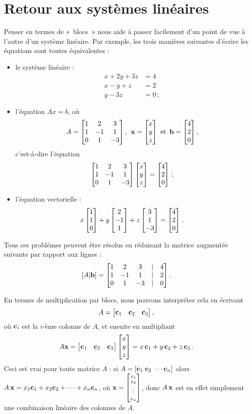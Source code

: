 \section{Retour aux systèmes linéaires}
Penser en termes de «~blocs~» nous aide à passer facilement d'un point de vue à l'autre d'un système linéaire. 
Par exemple, les trois manières suivantes d'écrire les équations sont toutes équivalentes :
\begin{itemize}
\item le système linéaire :
\begin{align*}
x+2y+3z &= 4\\
x-y+z &=2\\
 y-3z&=0\,;
\end{align*}
\item l'\'equation $Ax = b$, o\`u 
$$
A = \mat{1 & 2 & 3\\ 1 & -1 & 1\\ 0 & 1 & -3}, \hspace{0.15cm}\xx = \mat{x\\y\\z}\ \text{et }\, \bb=\mat{4\\2\\0},
$$
c'est-\`a-dire l'équation
$$
\left[ \begin{matrix} 1 & 2 & 3\\ 1 & -1 & 1\\ 0 & 1 & -3 \end{matrix} \right]\left[ \begin{matrix} x\\y\\z \end{matrix} \right]=\left[ \begin{matrix} 4\\2\\0 \end{matrix} \right]\,;
$$
\item l'\'equation vectorielle :
$$
x\left[ \begin{matrix} 1\\1\\0 \end{matrix} \right] + y\left[ \begin{matrix} 2\\-1\\1 \end{matrix} \right] + z\left[ \begin{matrix} 3\\1\\-3 \end{matrix} \right]  =\left[ \begin{matrix} 4\\2\\0 \end{matrix} \right]\,.
$$
\end{itemize}
Tous ces problèmes peuvent être résolus en réduisant la matrice augmentée suivante par rapport aux lignes :
$$
[A|\mathbf{b}] =  \left[ \begin{matrix} 1 & 2 & 3&|& 4\\ 1 & -1 & 1&|&2\\ 0 & 1 & -3&|&0 \end{matrix} \right].\\
$$

En termes de multiplication par blocs, nous pouvons interpr\'eter cela en 
écrivant
$$
A = \left[ \begin{matrix} \mathbf{c}_1 & \mathbf{c}_2 & \mathbf{c}_3 \end{matrix} \right],
$$
où $\mathbf{c}_i$ est la $i$-ème colonne de $A$, et ensuite en multipliant
$$
A\mathbf{x}= \left[ \begin{matrix} \mathbf{c}_1 & \mathbf{c}_2 & \mathbf{c}_3 \end{matrix} \right]\left[ \begin{matrix} x\\y\\z \end{matrix} \right] = x\,\mathbf{c}_1 + y\,\mathbf{c}_2 + z\,\mathbf{c}_3\,.
$$
Ceci est vrai pour toute matrice $A$ : si $A = [\mathbf{c}_1 \;\mathbf{c}_2 \; \cdots \mathbf{c}_n]$
alors $A\,\mathbf{x} = x_1\mathbf{c}_1 + x_2\mathbf{c}_2 + \cdots + x_n\mathbf{c}_n$, o\`u $\mathbf{x}=\scriptsize\left[ \begin{matrix} x_1\\x_2\\ \vdots \\ x_n \end{matrix} \right]$, donc $A\,\mathbf{x}$ est en effet simplement
une combinaison linéaire des colonnes de $A$.

